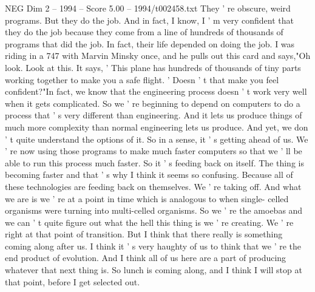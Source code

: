 \begin{textsample}{NEG Dim 2 – 1994 – Score 5.00 – 1994/t002458.txt}
They ' re obscure, weird programs.
But they do the job.
And in fact, I know, I ' m very confident that they do the job because they come from a line of hundreds of thousands of programs that did the job.
In fact, their life depended on doing the job.
I was riding in a 747 with Marvin Minsky once, and he pulls out this card and says,"Oh look.
Look at this.
It says, ' This plane has hundreds of thousands of tiny parts working together to make you a safe flight. ' Doesn ' t that make you feel confident?"In fact, we know that the engineering process doesn ' t work very well when it gets complicated.
So we ' re beginning to depend on computers to do a process that ' s very different than engineering.
And it lets us produce things of much more complexity than normal engineering lets us produce.
And yet, we don ' t quite understand the options of it.
So in a sense, it ' s getting ahead of us.
We ' re now using those programs to make much faster computers so that we ' ll be able to run this process much faster.
So it ' s feeding back on itself.
The thing is becoming faster and that ' s why I think it seems so confusing.
Because all of these technologies are feeding back on themselves.
We ' re taking off.
And what we are is we ' re at a point in time which is analogous to when single- celled organisms were turning into multi-celled organisms.
So we ' re the amoebas and we can ' t quite figure out what the hell this thing is we ' re creating.
We ' re right at that point of transition.
But I think that there really is something coming along after us.
I think it ' s very haughty of us to think that we ' re the end product of evolution.
And I think all of us here are a part of producing whatever that next thing is.
So lunch is coming along, and I think I will stop at that point, before I get selected out.

\end{textsample}
